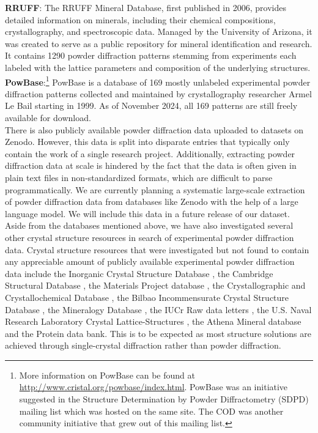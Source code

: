\textbf{RRUFF}: \cite{RRUFFWeb} The RRUFF Mineral Database, first published in 2006, provides detailed information on minerals, including their chemical compositions, crystallography, and spectroscopic data. \cite{lafuente2015} Managed by the University of Arizona, it was created to serve as a public repository for mineral identification and research. It contains \num{1290} powder diffraction patterns stemming from experiments each labeled with the lattice parameters and composition of the underlying structures. \\

\textbf{PowBase}:\footnote{More information on PowBase can be found at \url{http://www.cristal.org/powbase/index.html}. PowBase was an initiative suggested in the Structure Determination by Powder Diffractometry (SDPD) mailing list which was hosted on the same site. The COD was another community initiative that grew out of this mailing list.} PowBase is a database of 169 mostly unlabeled experimental powder diffraction patterns collected and maintained by crystallography researcher Armel Le Bail starting in 1999. As of November 2024, all 169 patterns are still freely available for download. \\

There is also publicly available powder diffraction data uploaded to datasets on Zenodo. However, this data is split into disparate entries that typically only contain the work of a single research project. Additionally, extracting powder diffraction data at scale is hindered by the fact that the data is often given in plain text files in non-standardized formats, which are difficult to parse programmatically. We are currently planning a systematic large-scale extraction of powder diffraction data from databases like Zenodo with the help of a large language model. We will include this data in a future release of our dataset.\\

Aside from the databases mentioned above, we have also investigated several other crystal structure resources in search of experimental powder diffraction data. Crystal structure resources that were investigated but not found to contain any appreciable amount of publicly available experimental powder diffraction data include the Inorganic Crystal Structure Database \cite{ICSDWeb}, the Cambridge Structural Database \cite{CambridgeWeb}, the Materials Project database \cite{MatProjWeb}, the Crystallographic and Crystallochemical Database \cite{CrystallochemicalWeb}, the Bilbao Incommensurate Crystal Structure Database \cite{BilbaoWeb}, the Mineralogy Database \cite{MineralogyWeb}, the IUCr Raw data letters \cite{IUCrWeb}, the U.S. Naval Research Laboratory Crystal Lattice-Structures \cite{NRLWeb}, the Athena Mineral database \cite{AthenaWeb} and the Protein data bank\cite{PDBWeb}. This is to be expected as most structure solutions are achieved through single-crystal diffraction rather than powder diffraction. \\ 